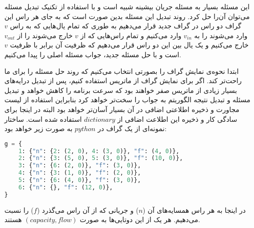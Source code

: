 \documentclass[]{article}
\begin{document}
این مسئله بسیار به مسئله جریان بیشینه شبیه است و با استفاده از تکنیک تبدیل مسئله می‌توان آن‌را حل کرد.
روند تبدیل این مسئله بدین صورت است که به جای هر راس این گراف دو راس در گراف جدید قرار می‌دهیم
به طوری که تمام یال‌هایی که به راس $v$ وارد می‌شوند را به $v_{in}$ وارد می‌کنیم
و تمام راس‌هایی که از $v$ خارج می‌شوند را از $v_{out}$ خارج می‌کنیم
و یک یال بین این دو راس قرار می‌دهیم که ظرفیت آن برابر با ظرفیت $v$ است
و با حل مسئله جدید، جواب مسئله اصلی را پیدا می‌کنیم.

ابتدا نحوه‌ی نمایش گراف را بصورتی انتخاب می‌کنیم که روند حل مسئله را برای ما راحت‌تر کند.
اگر برای نمایش گراف از ماتریس استفاده کنیم، پس از تبدیل درایه‌های بسیار زیادی از ماتریس صفر
خواهند بود که سرعت برنامه را کاهش خواهد و تبدیل مسئله و تبدیل نتیجه الگوریتم به جواب را سخت‌تر خواهد کرد
بنابراین استفاده از لیست مجاورت و ذخیره اطلاعتی اضافی در آن بسیار آسان‌تر خواهد بود
البته در اینجا برای سادگی کار و ذخیره این اطلاعت اضافی از $dictionary$ استفاده شده است.
ساختار نمونه‌ای از یک گراف در $python$ به صورت زیر خواهد بود:
\begin{latin}
\begin{lstlisting}[language=python]
g = {
    1: {"n": {2: (2, 0), 4: (3, 0)}, "f": (4, 0)},
    2: {"n": {3: (5, 0), 5: (3, 0)}, "f": (10, 0)},
    3: {"n": {6: (2, 0)}, "f": (3, 0)},
    4: {"n": {3: (1, 0)}, "f": (2, 0)},
    5: {"n": {6: (4, 0)}, "f": (3, 0)},
    6: {"n": {}, "f": (12, 0)},
}
\end{lstlisting} 
\end{latin}
در اینجا به هر راس همسایه‌های آن ($n$) و جریانی که از آن راس می‌گذرد ($f$) را نسبت می‌دهیم.
هر یک از این دوتایی‌ها به صورت $(capacity, flow)$ هستند.
\end{document}
